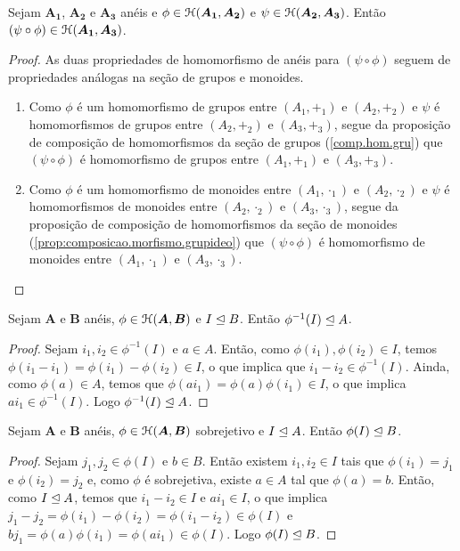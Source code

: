 \begin{corollary}
\label{prop:comp.hom.ane}
Sejam $\bm{A_1}$, $\bm{A_2}$ e $\bm{A_3}$ anéis e $\phi \in \mathcal{H}(\bm{A_1},\bm{A_2})$ e $\psi \in \mathcal{H}(\bm{A_2},\bm{A_3})$. Então $(\psi \circ \phi) \in \mathcal{H}(\bm{A_1},\bm{A_3})$.
\end{corollary}
\begin{proof}
As duas propriedades de homomorfismo de anéis para $(\psi \circ \phi)$ seguem de propriedades análogas na seção de grupos e monoides.
	\begin{enumerate}
	\item Como $\phi$ é um homomorfismo de grupos entre $(A_1,+_1)$ e $(A_2,+_2)$ e $\psi$ é homomorfismos de grupos entre $(A_2,+_2)$ e $(A_3,+_3)$, segue da proposição de composição de homomorfismos da seção de grupos (\ref{comp.hom.gru}) que $(\psi \circ \phi)$ é homomorfismo de grupos entre $(A_1,+_1)$ e $(A_3,+_3)$.
	\item Como $\phi$ é um homomorfismo de monoides entre $(A_1,\cdot_1)$ e $(A_2,\cdot_2)$ e $\psi$ é homomorfismos de monoides entre $(A_2,\cdot_2)$ e $(A_3,\cdot_3)$, segue da proposição de composição de homomorfismos da seção de monoides (\ref{prop:composicao.morfismo.grupideo}) que $(\psi \circ \phi)$ é homomorfismo de monoides entre $(A_1,\cdot_1)$ e $(A_3,\cdot_3)$.
	\end{enumerate}
\end{proof}

\begin{proposition}
\label{prop:ide.im.inv}
	Sejam $\bm A$ e $\bm B$ anéis, $\phi \in \mathcal{H}(\bm A,\bm B)$ e $I \mathrel{\unlhd} B$. Então $\phi^{-1}(I) \mathrel{\unlhd} A$.
\end{proposition}
\begin{proof}
	Sejam $i_1,i_2 \in \phi^{-1}(I)$ e $a \in A$. Então, como $\phi(i_1),\phi(i_2) \in I$, temos $\phi(i_1-i_1)=\phi(i_1)-\phi(i_2) \in I$, o que implica que $i_1-i_2 \in \phi^{-1}(I)$. Ainda, como $\phi(a) \in A$, temos que $\phi(ai_1)=\phi(a)\phi(i_1) \in I$, o que implica $ai_1 \in \phi^{-1}(I)$. Logo $\phi^{-1}(I) \mathrel{\unlhd} A$.
\end{proof}

\begin{proposition}
\label{prop:ide.im.ide}
	Sejam $\bm A$ e $\bm B$ anéis, $\phi \in \mathcal{H}(\bm A,\bm B)$ sobrejetivo e $I \mathrel{\unlhd} A$. Então $\phi(I) \mathrel{\unlhd} B$.
\end{proposition}
\begin{proof}
	Sejam $j_1,j_2 \in \phi(I)$ e $b \in B$. Então existem $i_1,i_2 \in I$ tais que $\phi(i_1)=j_1$ e $\phi(i_2)=j_2$ e, como $\phi$ é sobrejetiva, existe $a \in A$ tal que $\phi(a)=b$. Então, como $I \mathrel{\unlhd} A$, temos que $i_1-i_2 \in I$ e $ai_1 \in I$, o que implica $j_1-j_2 = \phi(i_1)-\phi(i_2) =\phi(i_1-i_2) \in \phi(I)$ e $bj_1=\phi(a)\phi(i_1)=\phi(ai_1) \in \phi(I)$. Logo $\phi(I) \mathrel{\unlhd} B$.
\end{proof}

